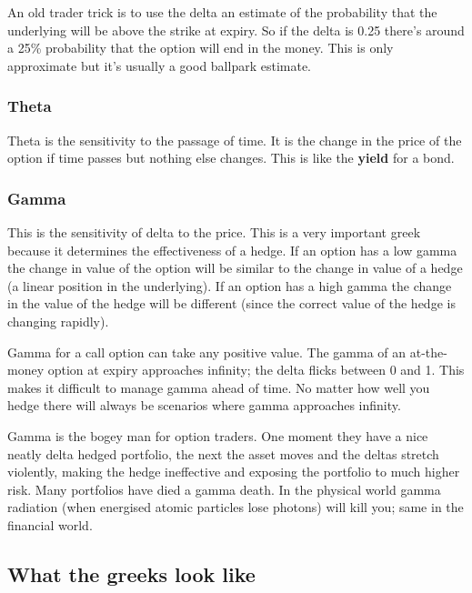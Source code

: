 An old trader trick is to use the delta an estimate of the probability that the underlying will be above the strike at expiry. So if the delta is 0.25 there's around a 25\% probability that the option will end in the money.  This is only approximate but it's usually a good ballpark estimate.

\subsubsection{Theta}

Theta is the sensitivity to the passage of time. It is the change in the price of the option if time passes but nothing else changes. This is like the \textbf{yield} for a bond.

\subsubsection{Gamma}

This is the sensitivity of delta to the price. This is a very important greek because it determines the effectiveness of a hedge. If an option has a low gamma the change in value of the option will be similar to the change in value of a hedge (a linear position in the underlying). If an option has a high gamma the change in the value of the hedge will be different (since the correct value of the hedge is changing rapidly). 

Gamma for a call option can take any positive value. The gamma of an at-the-money option at expiry approaches infinity; the delta flicks between 0 and 1. This makes it difficult to manage gamma ahead of time. No matter how well you hedge there will always be scenarios where gamma approaches infinity.

Gamma is the bogey man for option traders. One moment they have a nice neatly delta hedged portfolio, the next the asset moves and the deltas stretch violently, making the hedge ineffective and exposing the portfolio to much higher risk. Many portfolios have died a gamma death. In the physical world gamma radiation (when energised atomic particles lose photons) will kill you; same in the financial world.

\subsection{What the greeks look like}

